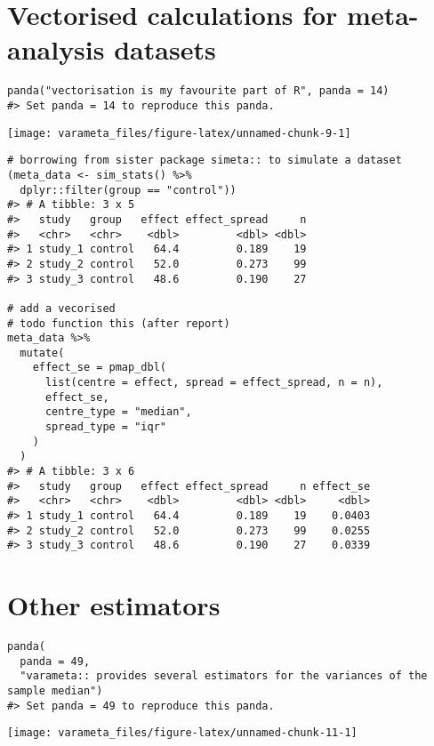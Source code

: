\documentclass[
]{article}
\begin{document}
\hypertarget{vectorised-calculations-for-meta-analysis-datasets}{%
\section{Vectorised calculations for meta-analysis
datasets}\label{vectorised-calculations-for-meta-analysis-datasets}}

\begin{verbatim}
panda("vectorisation is my favourite part of R", panda = 14)
#> Set panda = 14 to reproduce this panda.
\end{verbatim}

\begin{center}\texttt{[image: varameta\_files/figure-latex/unnamed-chunk-9-1]} \end{center}

\begin{verbatim}
# borrowing from sister package simeta:: to simulate a dataset
(meta_data <- sim_stats() %>% 
  dplyr::filter(group == "control"))
#> # A tibble: 3 x 5
#>   study   group   effect effect_spread     n
#>   <chr>   <chr>    <dbl>         <dbl> <dbl>
#> 1 study_1 control   64.4         0.189    19
#> 2 study_2 control   52.0         0.273    99
#> 3 study_3 control   48.6         0.190    27

# add a vecorised
# todo function this (after report)
meta_data %>% 
  mutate(
    effect_se = pmap_dbl(
      list(centre = effect, spread = effect_spread, n = n),
      effect_se,
      centre_type = "median",
      spread_type = "iqr"
    )
  )
#> # A tibble: 3 x 6
#>   study   group   effect effect_spread     n effect_se
#>   <chr>   <chr>    <dbl>         <dbl> <dbl>     <dbl>
#> 1 study_1 control   64.4         0.189    19    0.0403
#> 2 study_2 control   52.0         0.273    99    0.0255
#> 3 study_3 control   48.6         0.190    27    0.0339
\end{verbatim}

\hypertarget{other-estimators}{%
\section{Other estimators}\label{other-estimators}}

\begin{verbatim}
panda(
  panda = 49,
  "varameta:: provides several estimators for the variances of the sample median")
#> Set panda = 49 to reproduce this panda.
\end{verbatim}

\begin{center}\texttt{[image: varameta\_files/figure-latex/unnamed-chunk-11-1]} \end{center}
\end{document}
